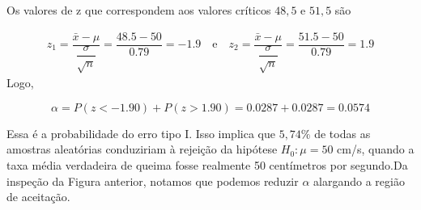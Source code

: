 \documentclass[14pt,aspectratio=1610]{beamer}
\newcommand{\bx}{\ensuremath{\bar{x}}}
\newcommand{\Ho}{\ensuremath{H_{0}}}
\begin{document}
\begin{frame}{}
\frametitle{}
\begin{block}{}
\justifying
Os valores de z que correspondem aos valores críticos $48,5$ e $51,5$ são

\begin{align*}
z_{1}=\dfrac{\bx-\mu}{\dfrac{\sigma}{\sqrt{n}}}=\dfrac{48.5-50}{0.79}=-1.9\quad \textrm{e}\quad z_{2}=\dfrac{\bx-\mu}{\dfrac{\sigma}{\sqrt{n}}}=\dfrac{51.5-50}{0.79}=1.9
\end{align*}
Logo,

$$\alpha=P(z<-1.90)+P(z>1.90)=0.0287+0.0287=0.0574$$

Essa é a probabilidade do erro tipo I. Isso implica que $5,74\%$ de todas as amostras aleatórias conduziriam à rejeição da hipótese $\Ho: \mu = 50$ cm/s, quando a 
taxa média verdadeira de queima fosse realmente 50 centímetros por segundo.Da inspeção da Figura anterior, notamos que podemos reduzir $\alpha$ alargando a 
região de aceitação.
\end{block}
\end{frame}
\end{document}
